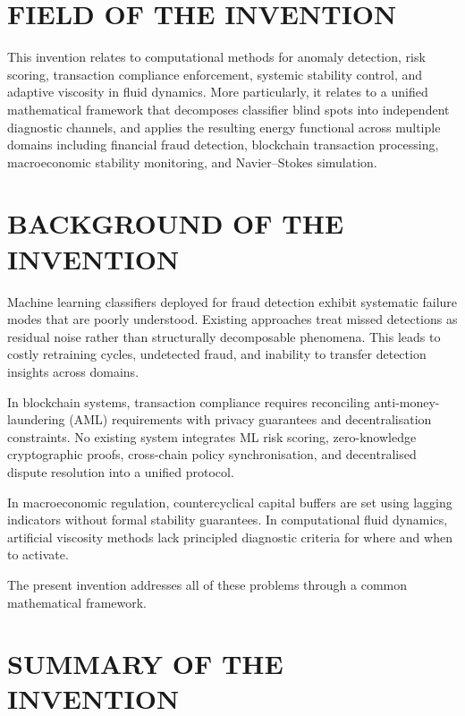 \documentclass[12pt,a4paper]{article}
\begin{document}
\newpage

\section{FIELD OF THE INVENTION}

This invention relates to computational methods for anomaly detection, risk
scoring, transaction compliance enforcement, systemic stability control, and
adaptive viscosity in fluid dynamics.  More particularly, it relates to a
unified mathematical framework that decomposes classifier blind spots into
independent diagnostic channels, and applies the resulting energy functional
across multiple domains including financial fraud detection, blockchain
transaction processing, macroeconomic stability monitoring, and Navier--Stokes
simulation.

\section{BACKGROUND OF THE INVENTION}

Machine learning classifiers deployed for fraud detection exhibit systematic
failure modes that are poorly understood.  Existing approaches treat missed
detections as residual noise rather than structurally decomposable phenomena.
This leads to costly retraining cycles, undetected fraud, and inability to
transfer detection insights across domains.

In blockchain systems, transaction compliance requires reconciling
anti-money-laundering (AML) requirements with privacy guarantees and
decentralisation constraints.  No existing system integrates ML risk scoring,
zero-knowledge cryptographic proofs, cross-chain policy synchronisation, and
decentralised dispute resolution into a unified protocol.

In macroeconomic regulation, countercyclical capital buffers are set using
lagging indicators without formal stability guarantees.  In computational fluid
dynamics, artificial viscosity methods lack principled diagnostic criteria for
where and when to activate.

The present invention addresses all of these problems through a common
mathematical framework.

\section{SUMMARY OF THE INVENTION}
\end{document}
